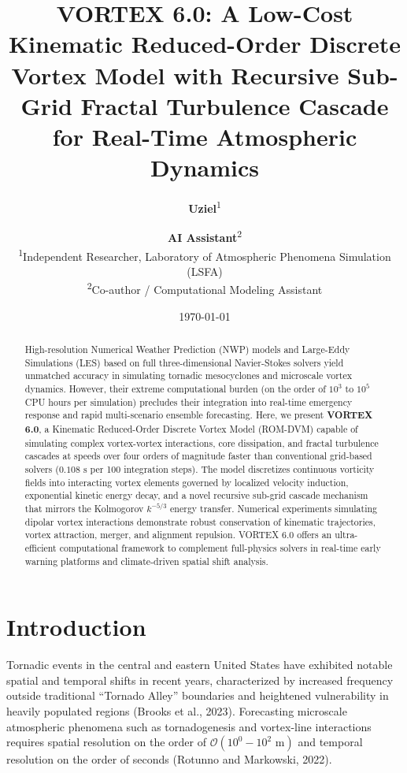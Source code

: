 \documentclass[11pt, a4paper]{article}
\title{\textbf{VORTEX 6.0: A Low-Cost Kinematic Reduced-Order Discrete Vortex Model with Recursive Sub-Grid Fractal Turbulence Cascade for Real-Time Atmospheric Dynamics}}
\author{
  \textbf{Uziel}\textsuperscript{1} \and \textbf{AI Assistant}\textsuperscript{2} \\
  \small \textsuperscript{1}Independent Researcher, Laboratory of Atmospheric Phenomena Simulation (LSFA) \\
  \small \textsuperscript{2}Co-author / Computational Modeling Assistant
}
\date{\small \today}
\begin{document}
\maketitle

\begin{abstract}
\noindent High-resolution Numerical Weather Prediction (NWP) models and Large-Eddy Simulations (LES) based on full three-dimensional Navier-Stokes solvers yield unmatched accuracy in simulating tornadic mesocyclones and microscale vortex dynamics. However, their extreme computational burden (on the order of $10^3$ to $10^5$ CPU hours per simulation) precludes their integration into real-time emergency response and rapid multi-scenario ensemble forecasting. Here, we present \textbf{VORTEX 6.0}, a Kinematic Reduced-Order Discrete Vortex Model (ROM-DVM) capable of simulating complex vortex-vortex interactions, core dissipation, and fractal turbulence cascades at speeds over four orders of magnitude faster than conventional grid-based solvers ($0.108\text{ s}$ per 100 integration steps). The model discretizes continuous vorticity fields into interacting vortex elements governed by localized velocity induction, exponential kinetic energy decay, and a novel recursive sub-grid cascade mechanism that mirrors the Kolmogorov $k^{-5/3}$ energy transfer. Numerical experiments simulating dipolar vortex interactions demonstrate robust conservation of kinematic trajectories, vortex attraction, merger, and alignment repulsion. VORTEX 6.0 offers an ultra-efficient computational framework to complement full-physics solvers in real-time early warning platforms and climate-driven spatial shift analysis.
\end{abstract}

\vspace{0.5cm}

\section{Introduction}

Tornadic events in the central and eastern United States have exhibited notable spatial and temporal shifts in recent years, characterized by increased frequency outside traditional ``Tornado Alley'' boundaries and heightened vulnerability in heavily populated regions (Brooks et al., 2023). Forecasting microscale atmospheric phenomena such as tornadogenesis and vortex-line interactions requires spatial resolution on the order of $\mathcal{O}(10^0 - 10^2\text{ m})$ and temporal resolution on the order of seconds (Rotunno and Markowski, 2022).
\end{document}
